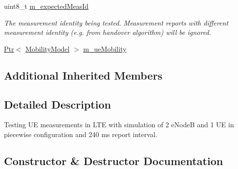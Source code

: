 \begin{DoxyCompactItemize}
uint8\+\_\+t \hyperlink{classLteUeMeasurementsPiecewiseTestCase2_af0d0ce23466c65b4ded17e0d8a5748bd}{m\+\_\+expected\+Meas\+Id}
\begin{DoxyCompactList}\small\item\em The measurement identity being tested. Measurement reports with different measurement identity (e.\+g. from handover algorithm) will be ignored. \end{DoxyCompactList}\item 
\hyperlink{classns3_1_1Ptr}{Ptr}$<$ \hyperlink{classns3_1_1MobilityModel}{Mobility\+Model} $>$ \hyperlink{classLteUeMeasurementsPiecewiseTestCase2_a085c911b012df1a52dde2bb903ba56e3}{m\+\_\+ue\+Mobility}
\end{DoxyCompactItemize}
\subsection*{Additional Inherited Members}


\subsection{Detailed Description}
Testing UE measurements in L\+TE with simulation of 2 e\+NodeB and 1 UE in piecewise configuration and 240 ms report interval. 

\subsection{Constructor \& Destructor Documentation}
